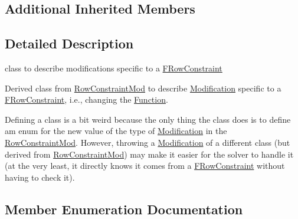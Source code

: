 \subsection*{Additional Inherited Members}


\subsection{Detailed Description}
class to describe modifications specific to a \mbox{\hyperlink{class_s_m_spp__di__unipi__it_1_1_f_row_constraint}{F\+Row\+Constraint}} 

Derived class from \mbox{\hyperlink{class_s_m_spp__di__unipi__it_1_1_row_constraint_mod}{Row\+Constraint\+Mod}} to describe \mbox{\hyperlink{class_s_m_spp__di__unipi__it_1_1_modification}{Modification}} specific to a \mbox{\hyperlink{class_s_m_spp__di__unipi__it_1_1_f_row_constraint}{F\+Row\+Constraint}}, i.\+e., changing the \mbox{\hyperlink{class_s_m_spp__di__unipi__it_1_1_function}{Function}}.

Defining a class is a bit weird because the only thing the class does is to define am enum for the new value of the type of \mbox{\hyperlink{class_s_m_spp__di__unipi__it_1_1_modification}{Modification}} in the \mbox{\hyperlink{class_s_m_spp__di__unipi__it_1_1_row_constraint_mod}{Row\+Constraint\+Mod}}. However, throwing a \mbox{\hyperlink{class_s_m_spp__di__unipi__it_1_1_modification}{Modification}} of a different class (but derived from \mbox{\hyperlink{class_s_m_spp__di__unipi__it_1_1_row_constraint_mod}{Row\+Constraint\+Mod}}) may make it easier for the solver to handle it (at the very least, it directly knows it comes from a \mbox{\hyperlink{class_s_m_spp__di__unipi__it_1_1_f_row_constraint}{F\+Row\+Constraint}} without having to check it). 

\subsection{Member Enumeration Documentation}
\mbox{\label{class_s_m_spp__di__unipi__it_1_1_f_row_constraint_mod_af140985c04c8a274ecc353a0eee2debb}} 
